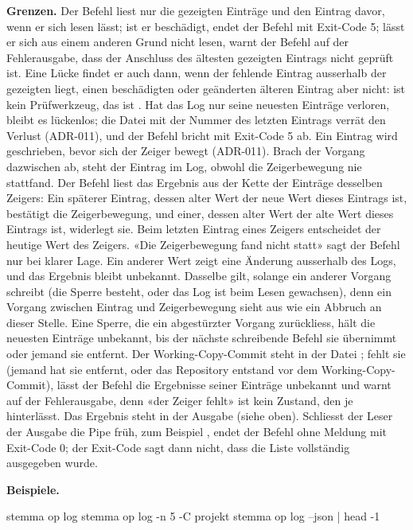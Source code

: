 {\bf Grenzen.} Der Befehl liest nur die gezeigten Einträge und den Eintrag davor, wenn er sich
lesen lässt; ist er beschädigt, endet der Befehl mit Exit-Code 5; lässt er sich aus einem anderen
Grund nicht lesen, warnt der Befehl auf der Fehlerausgabe, dass der Anschluss
des ältesten gezeigten Eintrags nicht geprüft ist. Eine Lücke findet er auch dann, wenn der
fehlende Eintrag ausserhalb der gezeigten liegt, einen beschädigten oder geänderten älteren
Eintrag aber nicht:  ist kein Prüfwerkzeug, das ist .
Hat das Log nur seine neuesten Einträge verloren, bleibt es lückenlos;
die Datei  mit der Nummer des letzten Eintrags verrät den Verlust (ADR-011), und
der Befehl bricht mit Exit-Code 5 ab. Ein Eintrag wird geschrieben, bevor sich der Zeiger bewegt
(ADR-011). Brach der Vorgang dazwischen ab, steht der Eintrag im Log, obwohl die Zeigerbewegung nie
stattfand. Der Befehl liest das Ergebnis aus der Kette der Einträge desselben Zeigers:
Ein späterer Eintrag, dessen alter Wert der neue Wert dieses Eintrags ist, bestätigt die
Zeigerbewegung, und einer, dessen alter Wert der alte Wert dieses Eintrags ist, widerlegt sie.
Beim letzten Eintrag eines Zeigers entscheidet der heutige Wert des Zeigers.
«Die Zeigerbewegung fand nicht statt» sagt der Befehl nur bei klarer Lage.
Ein anderer Wert zeigt eine Änderung ausserhalb des Logs, und das Ergebnis bleibt unbekannt.
Dasselbe gilt, solange ein anderer Vorgang schreibt (die Sperre  besteht, oder das
Log ist beim Lesen gewachsen), denn ein Vorgang zwischen Eintrag und Zeigerbewegung sieht aus wie
ein Abbruch an dieser Stelle. Eine Sperre, die ein abgestürzter Vorgang zurückliess, hält die
neuesten Einträge unbekannt, bis der nächste schreibende Befehl sie übernimmt oder jemand sie
entfernt. Der Working-Copy-Commit steht in der Datei
; fehlt sie (jemand hat sie entfernt, oder das Repository entstand vor dem
Working-Copy-Commit), lässt der Befehl die Ergebnisse seiner Einträge unbekannt und warnt auf der
Fehlerausgabe, denn «der Zeiger fehlt» ist kein Zustand, den  je hinterlässt.
Das Ergebnis steht in der Ausgabe (siehe oben). Schliesst der Leser der Ausgabe die Pipe früh, zum
Beispiel , endet der Befehl ohne Meldung mit Exit-Code 0;
der Exit-Code sagt dann nicht, dass die Liste vollständig ausgegeben wurde.

{\bf Beispiele.}

\starttyping
stemma op log
stemma op log -n 5 -C projekt
stemma op log --json | head -1
\stoptyping


